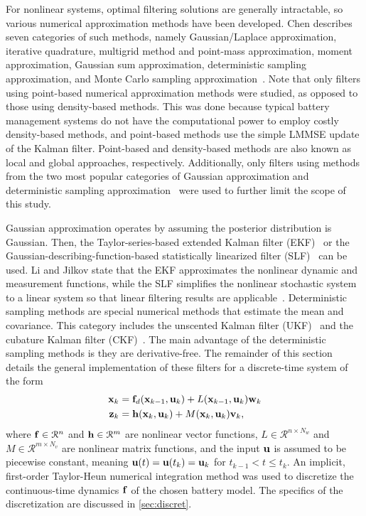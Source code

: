 \documentclass[../zhang_thesis.tex]{subfiles}
\begin{document}
For nonlinear systems, optimal filtering solutions are generally intractable, so various numerical approximation methods have been developed. Chen describes seven categories of such methods, namely Gaussian/Laplace approximation, iterative quadrature, multigrid method and point-mass approximation, moment approximation, Gaussian sum approximation, deterministic sampling approximation, and Monte Carlo sampling approximation~\cite{chen03}. Note that only filters using point-based
numerical approximation methods were studied, as opposed to those using density-based methods. This was done because typical battery management systems do not have the computational power to employ costly density-based methods, and point-based methods use the simple LMMSE update of the Kalman filter. Point-based and density-based methods are also known as local and global approaches, respectively. Additionally, only filters using methods from the two most popular categories of Gaussian
approximation and deterministic sampling approximation~\cite{li04} were used to further limit the scope of this study.

Gaussian approximation operates by assuming the posterior distribution is Gaussian. Then, the Taylor-series-based extended Kalman filter (EKF)~\cite{jazwinski70} or the Gaussian-describing-function-based statistically linearized filter (SLF)~\cite{gelb74} can be used. Li and Jilkov state that the EKF approximates the nonlinear dynamic and measurement functions, while the SLF simplifies the nonlinear stochastic system to a linear system so that linear filtering results are
applicable~\cite{li04}. Deterministic sampling methods are special numerical methods that estimate the mean and covariance. This category includes the unscented Kalman filter (UKF)~\cite{julier97} and the cubature Kalman filter (CKF)~\cite{arasaratnam10}. The main advantage of the deterministic sampling methods is they are derivative-free. The remainder of this section details the general implementation of these filters for a discrete-time system of the form
\begin{align}
    \mathbf{x}_k &= \mathbf{f}_d(\mathbf{x}_{k-1},\mathbf{u}_k) + L(\mathbf{x}_{k-1},\mathbf{u}_k) \mathbf{w}_k \label{eq:dtsys_x} \\
    \mathbf{z}_k &= \mathbf{h}(\mathbf{x}_k,\mathbf{u}_k) + M(\mathbf{x}_k,\mathbf{u}_k) \mathbf{v}_k, \label{eq:dtsys_z}
\end{align}
where $\mathbf{f}\in\mathcal{R}^n$ and $\mathbf{h}\in\mathcal{R}^m$ are nonlinear vector functions, $L\in\mathcal{R}^{n\times N_w}$ and $M\in\mathcal{R}^{m\times N_v}$ are nonlinear matrix functions, and the input $\mathbf{u}$ is assumed to be piecewise constant, meaning $\mathbf{u}(t)=\mathbf{u}(t_k)=\mathbf{u}_k$ for $t_{k-1}<t\le t_k$. An implicit, first-order Taylor-Heun numerical integration method was used to discretize the continuous-time dynamics $\mathbf{f}$ of the chosen battery model. The specifics of the discretization are discussed in \cref{sec:discret}.
\end{document}
